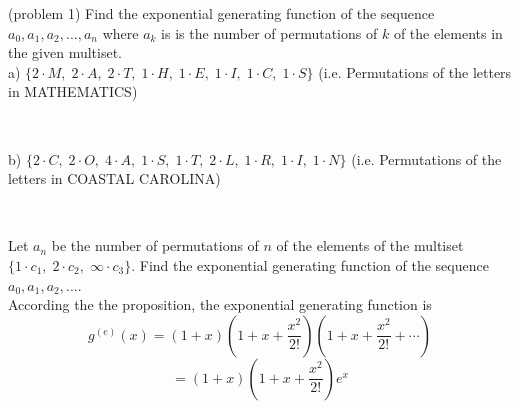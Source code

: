 \documentclass[handout]{ximera}
\begin{document}
\begin{problem}(problem 1)
Find the exponential generating function of the sequence $a_0, a_1, a_2, ..., a_{n}$ where $a_k$ is is the number of 
permutations of $k$ of the elements in the given multiset.\\
a) $\{2\cdot M,\; 2\cdot A,\; 2 \cdot T,\; 1\cdot H,\; 1\cdot E,\; 1\cdot I,\; 1\cdot C,\; 1\cdot S\}$ 
(i.e. Permutations of the letters in MATHEMATICS)
\begin{multipleChoice}
\\
\end{multipleChoice}



b) $\{2\cdot C,\; 2\cdot O,\; 4\cdot A,\; 1\cdot S,\; 1\cdot T,\; 2\cdot L,\; 1\cdot R,\; 1\cdot I,\; 1\cdot N\}$ 
(i.e. Permutations of the letters in COASTAL CAROLINA)
\begin{multipleChoice}
\\
\end{multipleChoice}

\end{problem}




\begin{example}[example 2]
Let $a_n$ be the number of permutations of $n$ of the elements of the multiset $\{1 \cdot c_1,\; 2 \cdot c_2,\; \infty \cdot c_3\}$.
Find the exponential generating function of the sequence $a_0, a_1, a_2, ...$.\\
According the the proposition, the exponential generating function is
\[
g^{(e)}(x) = (1+x)\left(1 + x + \frac{x^2}{2!}\right)\left(1 + x + \frac{x^2}{2!} + \cdots \right)
\]
\[
= (1+x)\left(1 + x + \frac{x^2}{2!}\right)e^x
\]
\end{example}
\end{document}
